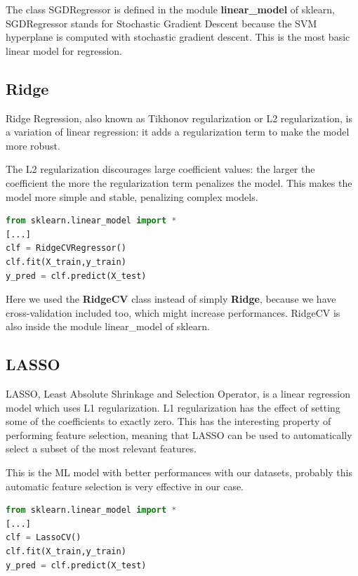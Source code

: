 The class SGDRegressor is defined in the module \textbf{linear\_model} of sklearn, SGDRegressor stands for Stochastic Gradient Descent because the SVM hyperplane is computed with stochastic gradient descent. This is the most basic linear model for regression.

\subsection{Ridge}
Ridge Regression, also known as Tikhonov regularization or L2 regularization, is a variation of linear regression: it adds a regularization term to make the model more robust.

The L2 regularization discourages large coefficient values: the larger the coefficient the more the regularization term penalizes the model. This makes the model more simple and stable, penalizing complex models.

\begin{lstlisting}[language=Python, caption=Ridge implementation]
from sklearn.linear_model import *
[...]
clf = RidgeCVRegressor()
clf.fit(X_train,y_train)
y_pred = clf.predict(X_test)
\end{lstlisting}

Here we used the \textbf{RidgeCV} class instead of simply \textbf{Ridge}, because we have cross-validation included too, which might increase performances. RidgeCV is also inside the module linear\_model of sklearn.

\subsection{LASSO}
LASSO, Least Absolute Shrinkage and Selection Operator, is a linear regression model which uses L1 regularization. L1 regularization has the effect of setting some of the coefficients to exactly zero. This has the interesting property of performing feature selection, meaning that LASSO can be used to automatically select a subset of the most relevant features.

This is the ML model with better performances with our datasets, probably this automatic feature selection is very effective in our case.

\begin{lstlisting}[language=Python, caption=LASSO implementation]
from sklearn.linear_model import *
[...]
clf = LassoCV()
clf.fit(X_train,y_train)
y_pred = clf.predict(X_test)
\end{lstlisting}


